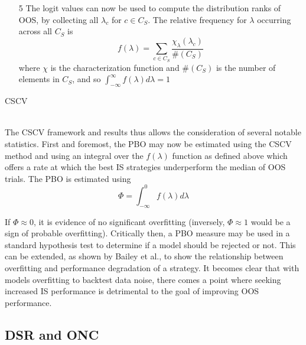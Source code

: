 \documentclass[a4paper,11pt,oneside]{article}
\theoremstyle{plain}
\theoremstyle{definition}
\begin{document}
\begin{algorithm}[H]
\begin{itemize}
\begin{itemize}
			\end{itemize}
			\item [5] The logit values can now be used to compute the distribution ranks of OOS, by collecting all $\lambda_c$ for $c \in C_S$. The relative frequency for $\lambda$ occurring across all $C_S$ is 
			\begin{equation}
			f(\lambda) = \sum_{c \in C_S}\frac{\chi_{\lambda}(\lambda_c)}{\#(C_S)}
			\end{equation}
			where $\chi$ is the characterization function and $\#(C_S)$ is the number of elements in $C_S$, and so $\int_{-\infty}^{\infty} f (\lambda) d \lambda = 1$
		\end{itemize}
		
		\label{algo_cscv}
		\caption{CSCV}
	\end{algorithm}
	
	
	
	\texttt{\\}
	\newline The CSCV framework and results thus allows the consideration of several notable statistics. First and foremost, 
	the PBO may now be estimated using the CSCV method and using an integral over the $f(\lambda)$ function 
	as defined above which offers a rate at which the best IS strategies underperform the median of OOS trials. The PBO is estimated using
	\begin{equation}
	\Phi = \int_{-\infty}^{0} f (\lambda) d \lambda
	\end{equation}
	
	
	If $\Phi \approx 0$,
	it is evidence of no significant overfitting (inversely, $\Phi \approx 1$ would be a sign of probable overfitting). Critically then, a PBO measure may be used in a standard hypothesis test to determine if a model should be rejected or not. This 
	can be extended, as shown by Bailey et al., to show the relationship between overfitting and performance 
	degradation of a strategy. It becomes clear that with models overfitting to backtest data noise, there comes a point 
	where seeking increased IS performance is detrimental to the goal of improving OOS performance.  
	\hfill \break 
	
	
	\subsection{DSR and ONC}\label{imp_dsr}
	
\end{document}
